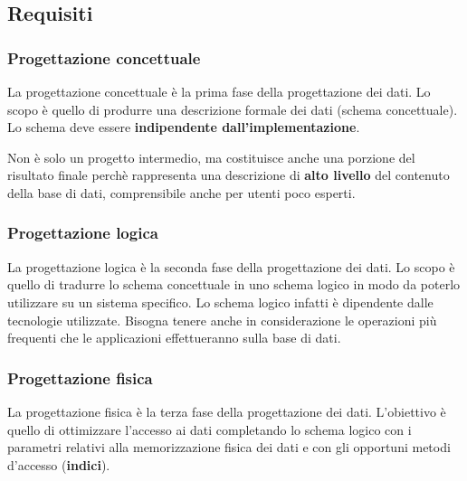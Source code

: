 \documentclass[a4paper,twoside]{article}
\begin{document}
\subsection{Requisiti}
\subsubsection{Progettazione concettuale}
La progettazione concettuale è la prima fase della progettazione dei dati. Lo scopo è
quello di produrre una descrizione formale dei dati (schema concettuale). Lo schema
deve essere \textbf{indipendente dall'implementazione}.

\vspace{1em}
\noindent
Non è solo un progetto intermedio, ma costituisce anche una porzione del risultato finale
perchè rappresenta una descrizione di \textbf{alto livello} del contenuto della base di
dati, comprensibile anche per utenti poco esperti.

\subsubsection{Progettazione logica}
La progettazione logica è la seconda fase della progettazione dei dati. Lo scopo è
quello di tradurre lo schema concettuale in uno schema logico in modo da poterlo
utilizzare su un sistema specifico. Lo schema logico infatti è dipendente dalle
tecnologie utilizzate. Bisogna tenere anche in considerazione le operazioni più
frequenti che le applicazioni effettueranno sulla base di dati.

\subsubsection{Progettazione fisica}
La progettazione fisica è la terza fase della progettazione dei dati. L'obiettivo è quello
di ottimizzare l'accesso ai dati completando lo schema logico con i parametri relativi
alla memorizzazione fisica dei dati e con gli opportuni metodi d'accesso (\textbf{indici}).
\end{document}
